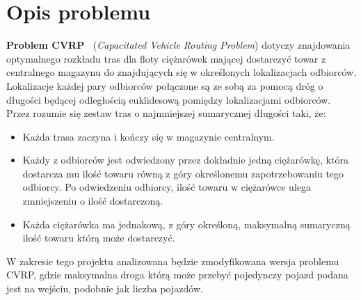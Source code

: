 \documentclass[10pt]{article}
\begin{document}
\section{Opis problemu}
\label{sec:problem}
\textbf{Problem CVRP~\cite{Dorigo2004}} (\textit{Capacitated Vehicle Routing Problem}) dotyczy znajdowania optymalnego rozkładu tras dla floty ciężarówek mającej dostarczyć towar z centralnego magazynu do znajdujących się w określonych lokalizacjach odbiorców. Lokalizacje każdej pary odbiorców połączone są ze sobą za pomocą dróg o długości będącej odległością euklidesową pomiędzy lokalizacjami odbiorców. Przez  rozumie się zestaw tras o najmniejszej sumarycznej długości taki, że:
\begin{itemize}
    \item Każda trasa zaczyna i kończy się w magazynie centralnym.
    \item Każdy z odbiorców jest odwiedzony przez dokładnie jedną ciężarówkę, która dostarcza mu ilość towaru równą z góry określonemu zapotrzebowaniu tego odbiorcy. Po odwiedzeniu odbiorcy, ilość towaru w ciężarówce ulega zmniejszeniu o ilość dostarczoną.
    \item Każda ciężarówka ma jednakową, z góry określoną, maksymalną sumaryczną ilość towaru którą może dostarczyć.
\end{itemize}

W zakresie tego projektu analizowana będzie zmodyfikowana wersja problemu CVRP, gdzie maksymalna droga którą może przebyć pojedynczy pojazd podana jest na wejściu, podobnie jak liczba pojazdów.
\end{document}
